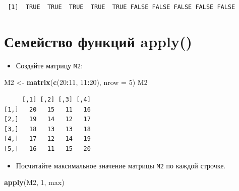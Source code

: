 \documentclass[
]{book}
\newenvironment{Shaded}{\begin{snugshade}}{\end{snugshade}}
\newcommand{\DataTypeTok}[1]{\textcolor[rgb]{0.13,0.29,0.53}{#1}}
\newcommand{\DecValTok}[1]{\textcolor[rgb]{0.00,0.00,0.81}{#1}}
\newcommand{\KeywordTok}[1]{\textcolor[rgb]{0.13,0.29,0.53}{\textbf{#1}}}
\newcommand{\NormalTok}[1]{#1}
\newcommand{\OperatorTok}[1]{\textcolor[rgb]{0.81,0.36,0.00}{\textbf{#1}}}
\newcommand{\StringTok}[1]{\textcolor[rgb]{0.31,0.60,0.02}{#1}}
\providecommand{\tightlist}{%
  \setlength{\itemsep}{0pt}\setlength{\parskip}{0pt}}
\begin{document}
\begin{Shaded}
\end{Shaded}

\begin{verbatim}
 [1]  TRUE  TRUE  TRUE  TRUE  TRUE FALSE FALSE FALSE FALSE FALSE
\end{verbatim}

\hypertarget{solution_apply}{%
\section{Семейство функций apply()}\label{solution_apply}}

\begin{itemize}
\tightlist
\item
  Создайте матрицу \texttt{M2}:
\end{itemize}

\begin{Shaded}
\begin{Highlighting}[]
\NormalTok{M2 <-}\StringTok{ }\KeywordTok{matrix}\NormalTok{(}\KeywordTok{c}\NormalTok{(}\DecValTok{20}\OperatorTok{:}\DecValTok{11}\NormalTok{, }\DecValTok{11}\OperatorTok{:}\DecValTok{20}\NormalTok{), }\DataTypeTok{nrow =} \DecValTok{5}\NormalTok{)}
\NormalTok{M2}
\end{Highlighting}
\end{Shaded}

\begin{verbatim}
     [,1] [,2] [,3] [,4]
[1,]   20   15   11   16
[2,]   19   14   12   17
[3,]   18   13   13   18
[4,]   17   12   14   19
[5,]   16   11   15   20
\end{verbatim}

\begin{itemize}
\tightlist
\item
  Посчитайте максимальное значение матрицы \texttt{M2} по каждой строчке.
\end{itemize}

\begin{Shaded}
\begin{Highlighting}[]
\KeywordTok{apply}\NormalTok{(M2, }\DecValTok{1}\NormalTok{, max)}
\end{Highlighting}
\end{Shaded}
\end{document}
